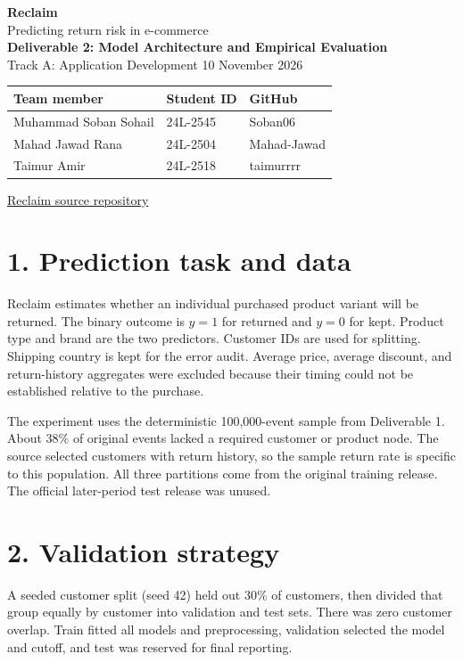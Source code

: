 \documentclass[11pt,a4paper]{article}
\begin{document}
{\LARGE\bfseries\color{reclaim} Reclaim}\\[3pt]
{\large Predicting return risk in e-commerce}\\[4pt]
\textbf{Deliverable 2: Model Architecture and Empirical Evaluation}\\
Track A: Application Development \hfill 10 November 2026

\begin{center}
\begin{tabularx}{\linewidth}{Xll}
\toprule Team member & Student ID & GitHub\\ \midrule
Muhammad Soban Sohail & 24L-2545 & Soban06\\
Mahad Jawad Rana & 24L-2504 & Mahad-Jawad\\
Taimur Amir & 24L-2518 & taimurrrr\\ \bottomrule
\end{tabularx}
\end{center}
\href{https://github.com/Soban06/Reclaim}{Reclaim source repository}

\section*{1. Prediction task and data}
Reclaim estimates whether an individual purchased product variant will be returned. The binary outcome is \(y=1\) for returned and \(y=0\) for kept. Product type and brand are the two predictors. Customer IDs are used for splitting. Shipping country is kept for the error audit. Average price, average discount, and return-history aggregates were excluded because their timing could not be established relative to the purchase.

The experiment uses the deterministic 100,000-event sample from Deliverable 1. About 38\% of original events lacked a required customer or product node. The source selected customers with return history, so the sample return rate is specific to this population. All three partitions come from the original training release. The official later-period test release was unused.

\section*{2. Validation strategy}
A seeded customer split (seed 42) held out 30\% of customers, then divided that group equally by customer into validation and test sets. There was zero customer overlap. Train fitted all models and preprocessing, validation selected the model and cutoff, and test was reserved for final reporting.
\end{document}
